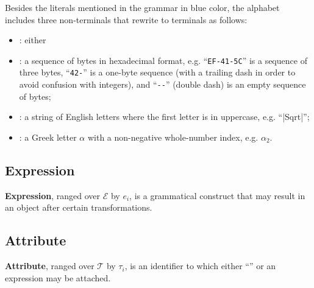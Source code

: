 Besides the literals mentioned in the grammar in blue color, the
alphabet includes three non-terminals that rewrite to terminals as follows:
\begin{itemize}
  \item {}: either 
  \item {}: a sequence of bytes in hexadecimal format, e.g. ``\texttt{EF-41-5C}'' is a sequence of three bytes, ``\texttt{42-}'' is a one-byte sequence (with a trailing dash in order to avoid confusion with integers), and ``\texttt{-{}-}'' (double dash) is an empty sequence of bytes;
  \item {}: a string of English letters where the first letter is in uppercase, e.g. ``|Sqrt|'';
  \item {}: a Greek letter \(\alpha\) with a non-negative whole-number index, e.g. \(\alpha_2\).
\end{itemize}

\subsection{Expression}\label{sec:expression}

\begin{definition}[Expression]
\textbf{Expression}, ranged over \(\mathcal{E}\) by \(e_i\),
is a grammatical construct that may result in an object after
certain transformations.
\end{definition}

\subsection{Attribute}\label{sec:attribute}

\begin{definition}[Attribute]
\textbf{Attribute}, ranged over \(\mathcal{T}\) by \(\tau_i\),
is an identifier to which either ``\stx{\varnothing}'' or an expression
may be attached.
\end{definition}

